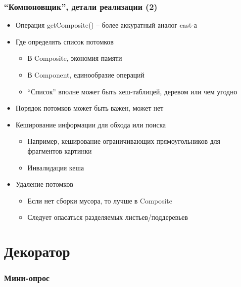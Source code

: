 \documentclass[xetex,mathserif,serif]{beamer}
\begin{document}
    \begin{frame}
        \frametitle{``Компоновщик'', детали реализации (2)}
        \begin{itemize}
            \item Операция getComposite() – более аккуратный аналог cast-а
            \item Где определять список потомков
            \begin{itemize}
                \item В Composite, экономия памяти
                \item В Component, единообразие операций
                \item ``Список'' вполне может быть хеш-таблицей, деревом или чем угодно
            \end{itemize}
            \item Порядок потомков может быть важен, может нет
            \item Кеширование информации для обхода или поиска
            \begin{itemize}
                \item Например, кеширование ограничивающих прямоугольников для фрагментов картинки
                \item Инвалидация кеша
            \end{itemize}
            \item Удаление потомков
            \begin{itemize}
                \item Если нет сборки мусора, то лучше в Composite
                \item Следует опасаться разделяемых листьев/поддеревьев
            \end{itemize}
        \end{itemize}
    \end{frame}

    \section{Декоратор}

    \begin{frame}
        \frametitle{Мини-опрос}
    \end{frame}
\end{document}
